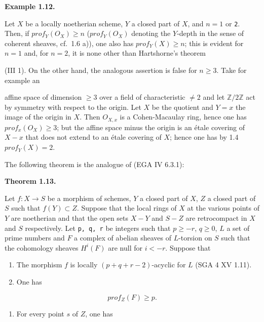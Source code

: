 \documentclass[
]{article}
\providecommand{\tightlist}{%
  \setlength{\itemsep}{0pt}\setlength{\parskip}{0pt}}
\begin{document}
\textbf{Example 1.12.}

Let \(X\) be a locally noetherian scheme, \(Y\) a closed part of \(X\),
and \(n = 1\) or \texttt{2}. Then, if \(prof_{Y}(O_{X}) \geqslant n\)
(\(prof_{Y}(O_{X})\) denoting the \(Y\)-depth in the sense of coherent
sheaves, cf.~1.6 a)), one also has \(prof_{Y}(X) \geqslant n\); this is
evident for \(n = 1\) and, for \(n = 2\), it is none other than
Hartshorne's theorem

(III 1). On the other hand, the analogous assertion is false for
\(n \geqslant 3\). Take for example an

affine space of dimension \(\geqslant 3\) over a field of characteristic
\(\neq 2\) and let \(\mathbb{Z}/2\mathbb{Z}\) act by symmetry with
respect to the origin. Let \(X\) be the quotient and \(Y = {x}\) the
image of the origin in \(X\). Then \(O_{X,x}\) is a Cohen-Macaulay ring,
hence one has \(prof_{x}(O_{X}) \geqslant 3\); but the affine space
minus the origin is an étale covering of \(X - {x}\) that does not
extend to an étale covering of \(X\); hence one has by 1.4
\(prof_{Y}(X) = 2\).

The following theorem is the analogue of (EGA IV 6.3.1):

\textbf{Theorem 1.13.}

Let \(f : X \to S\) be a morphism of schemes, \(Y\) a closed part of
\(X\), \(Z\) a closed part of \(S\) such that \(f(Y) \subset Z\).
Suppose that the local rings of \(X\) at the various points of \(Y\) are
noetherian and that the open sets \(X - Y\) and \(S - Z\) are
retrocompact in \(X\) and \(S\) respectively. Let \texttt{p,\ q,\ r} be
integers such that \(p \geqslant -r\), \(q \geqslant 0\), \(L\) a set of
prime numbers and \(F\) a complex of abelian sheaves of \(L\)-torsion on
\(S\) such that the cohomology sheaves \(H^{i}(F)\) are null for
\(i < -r\). Suppose that

\begin{enumerate}
\def\labelenumi{\alph{enumi})}
\item
  The morphism \(f\) is locally \((p + q + r - 2)\)-acyclic for \(L\)
  (SGA 4 XV 1.11).
\item
  One has
\end{enumerate}

\[
prof_{Z}(F) \geqslant p.
\]

\begin{enumerate}
\def\labelenumi{\alph{enumi})}
\setcounter{enumi}{2}
\tightlist
\item
  For every point \(s\) of \(Z\), one has
\end{enumerate}
\end{document}
